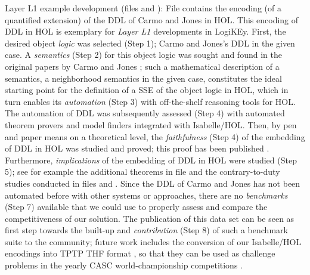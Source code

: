 \documentclass{article}
\begin{document}
\begin{description}
\item{Layer L1 example development (files \textsf{\small
      } and \textsf{\small
      }):} File \textsf{\small
    } contains the encoding (of a quantified
  extension) of the DDL of Carmo and Jones in
  HOL. This encoding of DDL in HOL is exemplary for \textit{Layer L1}
  developments in LogiKEy. First, the desired object \textit{logic}
  was selected (Step 1); Carmo and Jones's DDL in the given case. A \textit{semantics}
  (Step 2) for this object logic was sought and found in the original
  papers by Carmo and Jones \cite{Carmo2002,CJ13}; such a mathematical
  description of a semantics, a neighborhood semantics in the given
  case, constitutes the ideal starting point for the definition of a
  SSE of the object logic in HOL, which in turn enables its
  \textit{automation} (Step 3) with off-the-shelf reasoning tools for
  HOL. The automation of DDL was subsequently assessed (Step 4) with
  automated theorem provers and model finders integrated with
  Isabelle/HOL. Then, by pen and paper means on a theoretical level,
  the \textit{faithfulness} (Step 4) of the embedding of DDL in HOL
  was studied and proved; this proof has been published
  \cite{C71,R63}. Furthermore, \textit{implications} of the embedding
  of DDL in HOL were studied (Step 5); see for example the additional
  theorems in file \textsf{\small {}} and
  the contrary-to-duty studies conducted in files
  \textsf{\small {}} and
  \textsf{\small {}}. Since the DDL
  of Carmo and Jones has not been automated before with other systems
  or approaches, there are no \textit{benchmarks} (Step 7) available
  that we could use to properly assess and compare the competitiveness
  of our solution. The publication of this data set can be seen as
  first step towards the built-up and \textit{contribution} (Step 8)
  of such a benchmark suite to the community; future work includes the
  conversion of our Isabelle/HOL encodings into TPTP THF format
  \cite{J22}, so that they can be used as challenge problems in the yearly CASC
  world-championship competitions
  \cite{DBLP:journals/aim/Sutcliffe16}.


\end{description}
\end{document}
